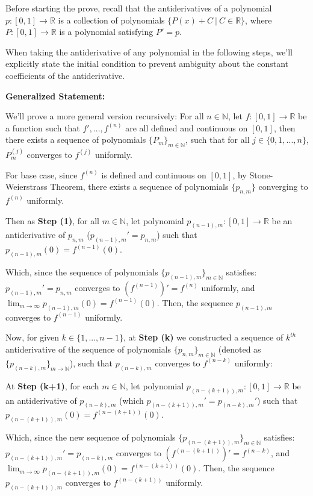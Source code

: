 \documentclass{article}
\begin{document}
Before starting the prove, recall that the antiderivatives of a polynomial $p:[0,1]\rightarrow\mathbb{R}$ is a collection of polynomials $\{P(x)+C\ |\ C\in\mathbb{R}\}$, 
where $P:[0,1]\rightarrow\mathbb{R}$ is a polynomial satisfying $P'=p$.

When taking the antiderivative of any polynomial in the following steps, we'll explicitly state the initial condition to prevent ambiguity about the constant coefficients of the antiderivative.

\hfill

\textbf{Generalized Statement:}

We'll prove a more general version recursively: For all $n\in\mathbb{N}$, let $f:[0,1]\rightarrow\mathbb{R}$ be a function such that $f',...,f^{(n)}$ are all defined and continuous on $[0,1]$,
then there exists a sequence of polynomials $\{P_m\}_{m\in\mathbb{N}}$, such that for all $j\in\{0,1,...,n\}$, $P_m^{(j)}$ converges to $f^{(j)}$ uniformly.

\hfill

For base case, since $f^{(n)}$ is defined and continuous on $[0,1]$, by Stone-Weierstrass Theorem, there exists a sequence of polynomials $\{p_{n,m}\}$ converging to $f^{(n)}$ uniformly.

Then as \textbf{Step (1)}, for all $m\in\mathbb{N}$, let polynomial $p_{(n-1),m}:[0,1]\rightarrow\mathbb{R}$ be an antiderivative of $p_{n,m}$ ($p_{(n-1),m}'=p_{n,m}$) such that $p_{(n-1),m}(0) = f^{(n-1)}(0)$.

Which, since the sequence of polynomials $\{p_{(n-1),m}\}_{m\in\mathbb{N}}$ satisfies: $p_{(n-1),m}' = p_{n,m}$ converges to $(f^{(n-1)})' = f^{(n)}$ uniformly, and $\lim_{m\rightarrow\infty}p_{(n-1),m}(0) = f^{(n-1)}(0)$.
Then, the sequence $p_{(n-1),m}$ converges to $f^{(n-1)}$ uniformly.

\hfill

Now, for given $k\in\{1,...,n-1\}$, at \textbf{Step (k)} we constructed a sequence of $k^{th}$ antiderivative of the sequence of polynomials $\{p_{n,m}\}_{m\in\mathbb{N}}$ (denoted as $\{p_{(n-k),m}\}_{m\rightarrow\mathbb{N}}$), such that $p_{(n-k),m}$ converges to $f^{(n-k)}$ uniformly:

At \textbf{Step (k+1)}, for each $m\in\mathbb{N}$, let polynomial $p_{(n-(k+1)),m}:[0,1]\rightarrow\mathbb{R}$ be an antiderivative of $p_{(n-k),m}$ (which $p_{(n-(k+1)),m}' = p_{(n-k),m}'$) such that $p_{(n-(k+1)),m}(0) = f^{(n-(k+1))}(0)$.

Which, since the new sequence of polynomials $\{p_{(n-(k+1)),m}\}_{m\in\mathbb{N}}$ satisfies: $p_{(n-(k+1)),m}'=p_{(n-k),m}$ converges to $(f^{(n-(k+1))})'=f^{(n-k)}$,
and $\lim_{m\rightarrow\infty}p_{(n-(k+1)),m}(0)=f^{(n-(k+1))}(0)$. Then, the sequence $p_{(n-(k+1)),m}$ converges to $f^{(n-(k+1))}$ uniformly.
\end{document}
